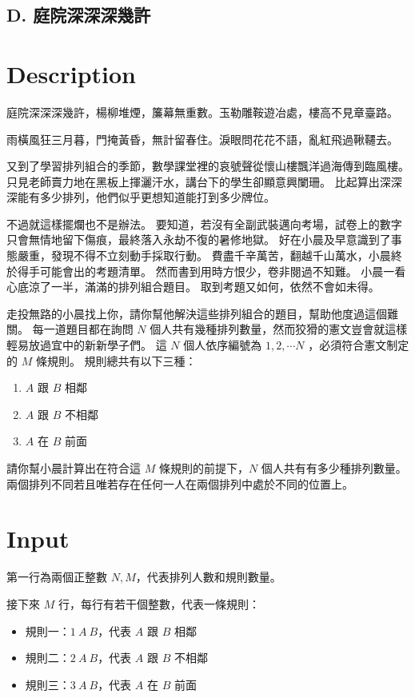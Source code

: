 \documentclass[11pt,a4paper]{article}
\begin{document}
\begin{center}
\section*{D. 庭院深深深幾許}
\end{center}

\section*{Description}

庭院深深深幾許，楊柳堆煙，簾幕無重數。玉勒雕鞍遊冶處，樓高不見章臺路。

雨橫風狂三月暮，門掩黃昏，無計留春住。淚眼問花花不語，亂紅飛過鞦韆去。

\vspace{1cm}
又到了學習排列組合的季節，數學課堂裡的哀號聲從懷山樓飄洋過海傳到臨風樓。
只見老師賣力地在黑板上揮灑汗水，講台下的學生卻顯意興闌珊。
比起算出深深深能有多少排列，他們似乎更想知道能打到多少牌位。

不過就這樣擺爛也不是辦法。
要知道，若沒有全副武裝邁向考場，試卷上的數字只會無情地留下傷痕，最終落入永劫不復的暑修地獄。
好在小晨及早意識到了事態嚴重，發現不得不立刻動手採取行動。
費盡千辛萬苦，翻越千山萬水，小晨終於得手可能會出的考題清單。
然而書到用時方恨少，卷非閱過不知難。
小晨一看心底涼了一半，滿滿的排列組合題目。
取到考題又如何，依然不會如未得。

走投無路的小晨找上你，請你幫他解決這些排列組合的題目，幫助他度過這個難關。
每一道題目都在詢問 $N$ 個人共有幾種排列數量，然而狡猾的憲文豈會就這樣輕易放過宜中的新新學子們。
這 $N$ 個人依序編號為 $1, 2, \cdots N$ ，必須符合憲文制定的 $M$ 條規則。
規則總共有以下三種：
\begin{enumerate}
	\item $A$ 跟 $B$ 相鄰
	\item $A$ 跟 $B$ 不相鄰
	\item $A$ 在 $B$ 前面
\end{enumerate}
請你幫小晨計算出在符合這 $M$ 條規則的前提下，$N$ 個人共有有多少種排列數量。
兩個排列不同若且唯若存在任何一人在兩個排列中處於不同的位置上。


\section*{Input}

第一行為兩個正整數 $N, M$，代表排列人數和規則數量。

接下來 $M$ 行，每行有若干個整數，代表一條規則：
\begin{itemize}
  \item 規則一：$1\ A\ B$，代表 $A$ 跟 $B$ 相鄰
  \item 規則二：$2\ A\ B$，代表 $A$ 跟 $B$ 不相鄰
  \item 規則三：$3\ A\ B$，代表 $A$ 在 $B$ 前面
\end{itemize}
\end{document}
